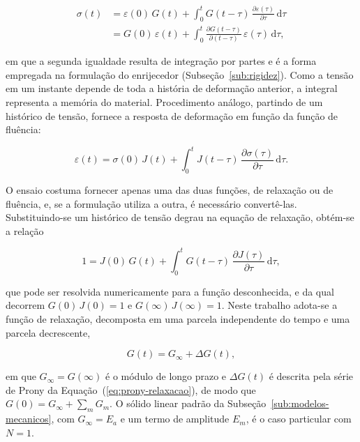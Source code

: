 \documentclass[arial,centeredequations,english,brazilian,oneside,section=TITLE]{ifes8}
\begin{document}
\begin{align}
  \sigma(t) &= \varepsilon(0)\,G(t)
  + \int_0^t G(t - \tau)\,\frac{\partial \varepsilon(\tau)}{\partial \tau}\,\mathrm{d}\tau
  \nonumber\\
  &= G(0)\,\varepsilon(t)
  + \int_0^t \frac{\partial G(t - \tau)}{\partial (t - \tau)}\,\varepsilon(\tau)\,\mathrm{d}\tau,
  \label{eq:ve-relaxacao-integral}
\end{align}

em que a segunda igualdade resulta de integração por partes e é a forma empregada na
formulação do enrijecedor (Subseção~\ref{sub:rigidez}). Como a tensão em um instante
depende de toda a história de deformação anterior, a integral representa a memória do
material. Procedimento análogo, partindo de um histórico de tensão, fornece a resposta de
deformação em função da função de fluência:

\begin{equation}
  \label{eq:ve-fluencia-integral}
  \varepsilon(t) = \sigma(0)\,J(t)
  + \int_0^t J(t - \tau)\,\frac{\partial \sigma(\tau)}{\partial \tau}\,\mathrm{d}\tau.
\end{equation}

O ensaio costuma fornecer apenas uma das duas funções, de relaxação ou de fluência, e, se
a formulação utiliza a outra, é necessário convertê-las. Substituindo-se um histórico de
tensão degrau na equação de relaxação, obtém-se a relação

\begin{equation}
  \label{eq:ve-relacao-G-J}
  1 = J(0)\,G(t) + \int_0^t G(t - \tau)\,\frac{\partial J(\tau)}{\partial \tau}\,\mathrm{d}\tau,
\end{equation}

que pode ser resolvida numericamente para a função desconhecida, e da qual decorrem
$G(0)\,J(0) = 1$ e $G(\infty)\,J(\infty) = 1$. Neste trabalho
adota-se a função de relaxação, decomposta em uma parcela independente do tempo e uma
parcela decrescente,

\begin{equation}
  \label{eq:ve-G-decomposicao}
  G(t) = G_{\infty} + \Delta G(t),
\end{equation}

em que $G_{\infty} = G(\infty)$ é o módulo de longo prazo e $\Delta G(t)$ é descrita pela
série de Prony da Equação~(\ref{eq:prony-relaxacao}), de modo que
$G(0) = G_{\infty} + \sum_{m} G_m$. O sólido linear padrão da
Subseção~\ref{sub:modelos-mecanicos}, com $G_{\infty} = E_a$ e um termo de amplitude
$E_m$, é o caso particular com $N = 1$.
\end{document}
